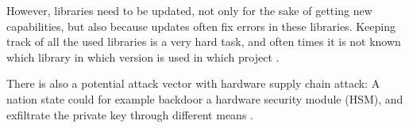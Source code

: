 However, libraries need to be updated, not only for the sake of getting new capabilities,
but also because updates often fix errors in these libraries.
Keeping track of all the used libraries is a very hard task, and often times it is not
known which library in which version is used in which project \cite{Log4Shell21}.

There is also a potential attack vector with hardware supply chain attack:
A nation state could for example backdoor a hardware security module (HSM), 
and exfiltrate the private key through different means \cite{SchneierBackdoor25}.
